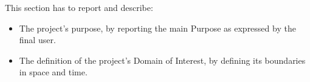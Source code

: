 

This section has to report and describe:
\begin{itemize}
    \item The project's purpose, by reporting the main Purpose as expressed by the final user.

    \item The definition of the project's Domain of Interest, by defining its boundaries in space and time.

\end{itemize}